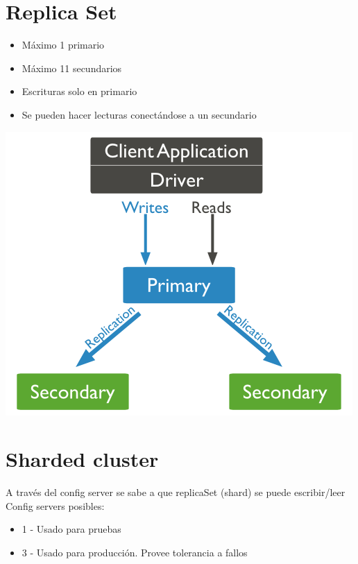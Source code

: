 \documentclass[a4paper,10pt,english]{sphinxmanual}
\begin{document}
\section{Replica Set}
\label{contents/desplieguesTipo:replica-set}\begin{itemize}
\item {} 
Máximo 1 primario

\item {} 
Máximo 11 secundarios

\item {} 
Escrituras solo en primario

\item {} 
Se pueden hacer lecturas conectándose a un secundario

\end{itemize}

\includegraphics{replica-set-read-write-operations-primary.png}


\section{Sharded cluster}
\label{contents/desplieguesTipo:sharded-cluster}
A través del config server se sabe a que replicaSet (shard) se puede escribir/leer
Config servers posibles:
\begin{itemize}
\item {} 
1 - Usado para pruebas

\item {} 
3 - Usado para producción. Provee tolerancia a fallos

\end{itemize}
\end{document}

